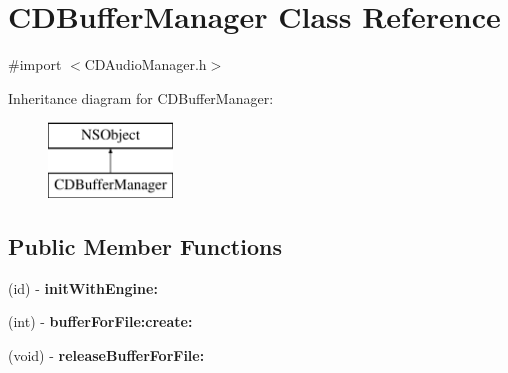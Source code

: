 \hypertarget{interface_c_d_buffer_manager}{\section{C\-D\-Buffer\-Manager Class Reference}
\label{interface_c_d_buffer_manager}
}


{\ttfamily \#import $<$C\-D\-Audio\-Manager.\-h$>$}

Inheritance diagram for C\-D\-Buffer\-Manager\-:\begin{figure}[H]
\begin{center}
\leavevmode
\includegraphics[height=2.000000cm]{interface_c_d_buffer_manager}
\end{center}
\end{figure}
\subsection*{Public Member Functions}
\begin{DoxyCompactItemize}
\item 
\hypertarget{interface_c_d_buffer_manager_a3150780df7e0bb0ce936dd4ed6e13ae1}{(id) -\/ {\bfseries init\-With\-Engine\-:}}\label{interface_c_d_buffer_manager_a3150780df7e0bb0ce936dd4ed6e13ae1}

\item 
\hypertarget{interface_c_d_buffer_manager_a76c75a5e30fc10d080aacd784511fbd1}{(int) -\/ {\bfseries buffer\-For\-File\-:create\-:}}\label{interface_c_d_buffer_manager_a76c75a5e30fc10d080aacd784511fbd1}

\item 
\hypertarget{interface_c_d_buffer_manager_ab47389167fe36f305a28ae296d85e299}{(void) -\/ {\bfseries release\-Buffer\-For\-File\-:}}\label{interface_c_d_buffer_manager_ab47389167fe36f305a28ae296d85e299}

\end{DoxyCompactItemize}

